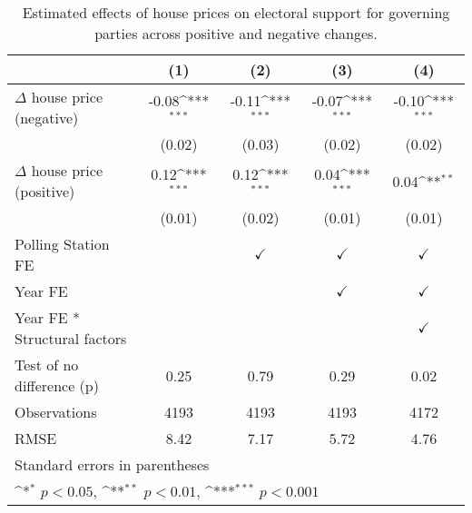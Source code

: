 \begin{table}[htbp]\centering
\def\sym#1{\ifmmode^{#1}\else\(^{#1}\)\fi}
\caption{Estimated effects of house prices on electoral support for governing parties across positive and negative changes.}
\begin{tabular}{l*{4}{c}}
\hline\hline
                    &\multicolumn{1}{c}{(1)}         &\multicolumn{1}{c}{(2)}         &\multicolumn{1}{c}{(3)}         &\multicolumn{1}{c}{(4)}         \\
\hline
$\Delta$ house price (negative)&       -0.08\sym{***}&       -0.11\sym{***}&       -0.07\sym{***}&       -0.10\sym{***}\\
                    &      (0.02)         &      (0.03)         &      (0.02)         &      (0.02)         \\
[1em]
$\Delta$ house price (positive)&        0.12\sym{***}&        0.12\sym{***}&        0.04\sym{***}&        0.04\sym{**} \\
                    &      (0.01)         &      (0.02)         &      (0.01)         &      (0.01)         \\
[1em]
\hline Polling Station FE&                     &$\checkmark$         &$\checkmark$         &$\checkmark$         \\
[1em]
Year FE             &                     &                     &$\checkmark$         &$\checkmark$         \\
[1em]
Year FE * Structural factors&                     &                     &                     &$\checkmark$         \\
\hline
Test of no difference (p)&        0.25         &        0.79         &        0.29         &        0.02         \\
Observations        &        4193         &        4193         &        4193         &        4172         \\
RMSE                &        8.42         &        7.17         &        5.72         &        4.76         \\
\hline\hline
\multicolumn{5}{l}{\footnotesize Standard errors in parentheses}\\
\multicolumn{5}{l}{\footnotesize \sym{*} \(p<0.05\), \sym{**} \(p<0.01\), \sym{***} \(p<0.001\)}\\
\end{tabular}
\end{table}
